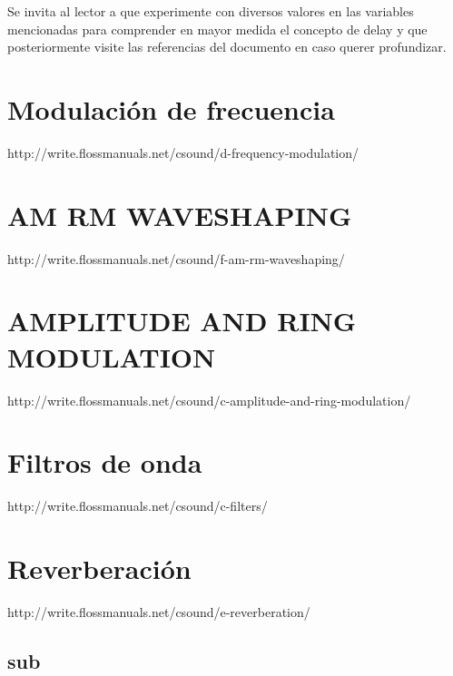 
Se invita al lector a que experimente con diversos valores en las variables mencionadas para comprender en mayor medida el concepto de delay y que posteriormente visite las referencias del documento en caso querer profundizar.

\section{Modulación de frecuencia}
http://write.flossmanuals.net/csound/d-frequency-modulation/
\section{AM RM WAVESHAPING}
http://write.flossmanuals.net/csound/f-am-rm-waveshaping/
\section{AMPLITUDE AND RING MODULATION}
http://write.flossmanuals.net/csound/c-amplitude-and-ring-modulation/
\section{Filtros de onda}
http://write.flossmanuals.net/csound/c-filters/
\section{Reverberación}
http://write.flossmanuals.net/csound/e-reverberation/

\subsection{sub}


 

